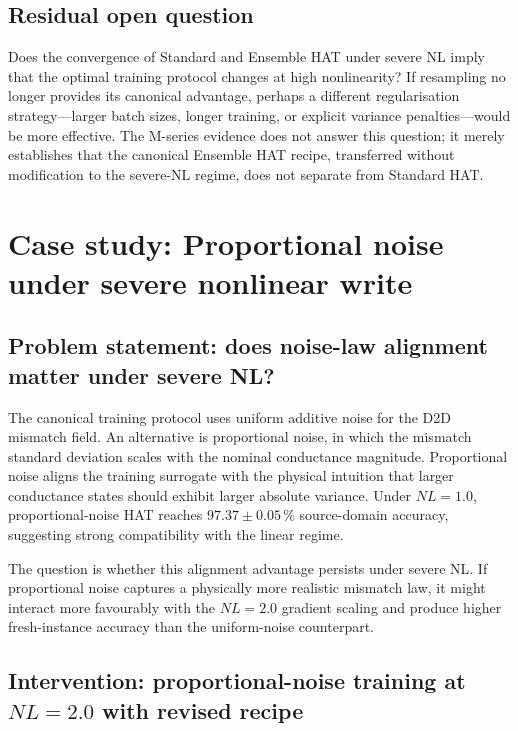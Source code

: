 \subsection{Residual open question}

Does the convergence of Standard and Ensemble HAT under severe NL imply that the optimal training protocol changes at high nonlinearity?  If resampling no longer provides its canonical advantage, perhaps a different regularisation strategy---larger batch sizes, longer training, or explicit variance penalties---would be more effective.  The M-series evidence does not answer this question; it merely establishes that the canonical Ensemble HAT recipe, transferred without modification to the severe-NL regime, does not separate from Standard HAT.


\section{Case study: Proportional noise under severe nonlinear write}
\label{sec:case-severe-nl-proportional}

\subsection{Problem statement: does noise-law alignment matter under severe NL?}

The canonical training protocol uses uniform additive noise for the D2D mismatch field.  An alternative is proportional noise, in which the mismatch standard deviation scales with the nominal conductance magnitude.  Proportional noise aligns the training surrogate with the physical intuition that larger conductance states should exhibit larger absolute variance.  Under $NL=1.0$, proportional-noise HAT reaches $97.37\pm0.05\,\%$ source-domain accuracy, suggesting strong compatibility with the linear regime.

The question is whether this alignment advantage persists under severe NL.  If proportional noise captures a physically more realistic mismatch law, it might interact more favourably with the $NL=2.0$ gradient scaling and produce higher fresh-instance accuracy than the uniform-noise counterpart.

\subsection{Intervention: proportional-noise training at $NL=2.0$ with revised recipe}

